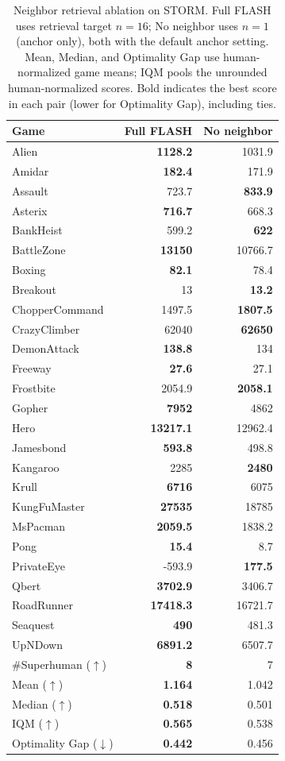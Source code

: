\documentclass{article} %
\begin{document}
\begin{table}[!htbp]
\centering
\small
\caption{Neighbor retrieval ablation on STORM. Full FLASH uses retrieval target $n=16$; No neighbor uses $n=1$ (anchor only), both with the default anchor setting. Mean, Median, and Optimality Gap use human-normalized game means; IQM pools the unrounded human-normalized scores. Bold indicates the best score in each pair (lower for Optimality Gap), including ties.}
\label{tab:neighbor_retrieval_ablation}
\begin{tabular}{lrr}
\toprule
Game & Full FLASH & No neighbor \\
\midrule
Alien & \textbf{1128.2} & 1031.9 \\
Amidar & \textbf{182.4} & 171.9 \\
Assault & 723.7 & \textbf{833.9} \\
Asterix & \textbf{716.7} & 668.3 \\
BankHeist & 599.2 & \textbf{622} \\
BattleZone & \textbf{13150} & 10766.7 \\
Boxing & \textbf{82.1} & 78.4 \\
Breakout & 13 & \textbf{13.2} \\
ChopperCommand & 1497.5 & \textbf{1807.5} \\
CrazyClimber & 62040 & \textbf{62650} \\
DemonAttack & \textbf{138.8} & 134 \\
Freeway & \textbf{27.6} & 27.1 \\
Frostbite & 2054.9 & \textbf{2058.1} \\
Gopher & \textbf{7952} & 4862 \\
Hero & \textbf{13217.1} & 12962.4 \\
Jamesbond & \textbf{593.8} & 498.8 \\
Kangaroo & 2285 & \textbf{2480} \\
Krull & \textbf{6716} & 6075 \\
KungFuMaster & \textbf{27535} & 18785 \\
MsPacman & \textbf{2059.5} & 1838.2 \\
Pong & \textbf{15.4} & 8.7 \\
PrivateEye & -593.9 & \textbf{177.5} \\
Qbert & \textbf{3702.9} & 3406.7 \\
RoadRunner & \textbf{17418.3} & 16721.7 \\
Seaquest & \textbf{490} & 481.3 \\
UpNDown & \textbf{6891.2} & 6507.7 \\
\midrule
\#Superhuman ($\uparrow$) & \textbf{8} & 7 \\
Mean ($\uparrow$) & \textbf{1.164} & 1.042 \\
Median ($\uparrow$) & \textbf{0.518} & 0.501 \\
IQM ($\uparrow$) & \textbf{0.565} & 0.538 \\
Optimality Gap ($\downarrow$) & \textbf{0.442} & 0.456 \\
\bottomrule
\end{tabular}
\end{table}
\FloatBarrier
\end{document}
